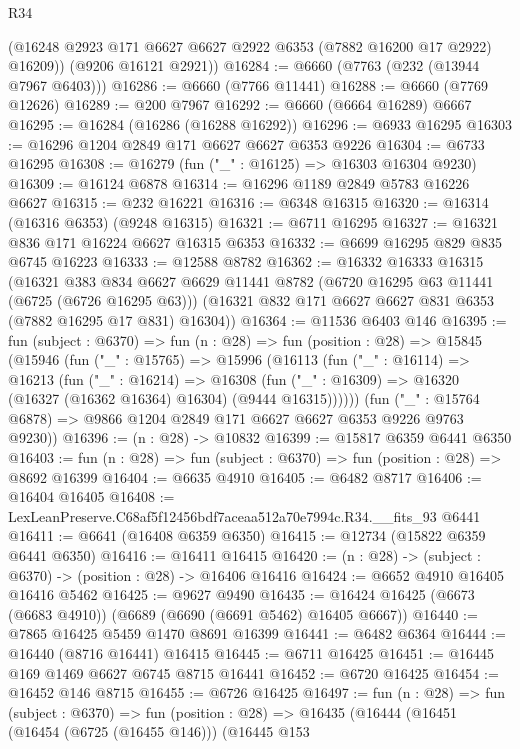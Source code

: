 \begin{lexlean}{R34}
\begin{coremodule}
        (@16248 @2923 @171 @6627 @6627 @2922 @6353 (@7882 @16200 @17 @2922) @16209))
      (@9206 @16121 @2921))
@16284 := @6660 (@7763 (@232 (@13944 @7967 @6403)))
@16286 := @6660 (@7766 @11441)
@16288 := @6660 (@7769 @12626)
@16289 := @200 @7967
@16292 := @6660 (@6664 @16289) @6667
@16295 := @16284 (@16286 (@16288 @16292))
@16296 := @6933 @16295
@16303 := @16296 @1204 @2849 @171 @6627 @6627 @6353 @9226
@16304 := @6733 @16295
@16308 := @16279 (fun ("_" : @16125) => @16303 @16304 @9230)
@16309 := @16124 @6878
@16314 := @16296 @1189 @2849 @5783 @16226 @6627
@16315 := @232 @16221
@16316 := @6348 @16315
@16320 := @16314 (@16316 @6353) (@9248 @16315)
@16321 := @6711 @16295
@16327 := @16321 @836 @171 @16224 @6627 @16315 @6353
@16332 := @6699 @16295 @829 @835 @6745 @16223
@16333 := @12588 @8782
@16362 := @16332
    @16333
    @16315
    (@16321
      @383
      @834
      @6627
      @6629
      @11441
      @8782
      (@6720 @16295 @63 @11441 (@6725 (@6726 @16295 @63)))
      (@16321 @832 @171 @6627 @6627 @831 @6353 (@7882 @16295 @17 @831) @16304))
@16364 := @11536 @6403 @146
@16395 := fun (subject : @6370) =>
  fun (n : @28) =>
  fun (position : @28) =>
  @15845
    (@15946
      (fun ("_" : @15765) =>
      @15996
        (@16113
          (fun ("_" : @16114) =>
          @16213
            (fun ("_" : @16214) =>
            @16308 (fun ("_" : @16309) => @16320 (@16327 (@16362 @16364) @16304) (@9444 @16315))))))
      (fun ("_" : @15764 @6878) => @9866 @1204 @2849 @171 @6627 @6627 @6353 @9226 @9763 @9230))
@16396 := (n : @28) -> @10832
@16399 := @15817 @6359 @6441 @6350
@16403 := fun (n : @28) => fun (subject : @6370) => fun (position : @28) => @8692 @16399
@16404 := @6635 @4910
@16405 := @6482 @8717
@16406 := @16404 @16405
@16408 := LexLeanPreserve.C68af5f12456bdf7aceaa512a70e7994c.R34.__fits_93 @6441
@16411 := @6641 (@16408 @6359 @6350)
@16415 := @12734 (@15822 @6359 @6441 @6350)
@16416 := @16411 @16415
@16420 := (n : @28) -> (subject : @6370) -> (position : @28) -> @16406 @16416
@16424 := @6652 @4910 @16405 @16416 @5462
@16425 := @9627 @9490
@16435 := @16424 @16425 (@6673 (@6683 @4910)) (@6689 (@6690 (@6691 @5462) @16405 @6667))
@16440 := @7865 @16425 @5459 @1470 @8691 @16399
@16441 := @6482 @6364
@16444 := @16440 (@8716 @16441) @16415
@16445 := @6711 @16425
@16451 := @16445 @169 @1469 @6627 @6745 @8715 @16441
@16452 := @6720 @16425
@16454 := @16452 @146 @8715
@16455 := @6726 @16425
@16497 := fun (n : @28) =>
  fun (subject : @6370) =>
  fun (position : @28) =>
  @16435
    (@16444
      (@16451
        (@16454 (@6725 (@16455 @146)))
        (@16445
          @153

\end{coremodule}
\end{lexlean}
